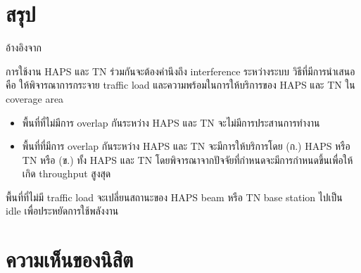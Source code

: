 \section{สรุป}

อ้างอิงจาก \cite[Interference Coordination Method for Integrated HAPS-Terrestrial Networks]{liu2021interference}

การใช้งาน HAPS และ TN ร่วมกันจะต้องคำนึงถึง interference ระหว่างระบบ
วิธีที่มีการนำเสนอคือ ให้พิจารณาการกระจาย traffic load และความพร้อมในการให้บริการของ
HAPS และ TN ใน coverage area

\begin{itemize}
    \item พื้นที่ที่ไม่มีการ overlap กันระหว่าง HAPS และ TN จะไม่มีการประสานการทำงาน
    \item พื้นที่ที่มีการ overlap กันระหว่าง HAPS และ TN จะมีการให้บริการโดย (ก.) HAPS หรือ TN หรือ (ข.) ทั้ง HAPS และ TN
            โดยพิจารณาจากปัจจัยที่กำหนดจะมีการกำหนดขึ้นเพื่อให้เกิด throughput สูงสุด
\end{itemize}

พื้นที่ที่ไม่มี traffic load จะเปลี่ยนสถานะของ HAPS beam หรือ TN base station ไปเป็น idle เพื่อประหยัดการใช้พลังงาน

\section{ความเห็นของนิสิต}
